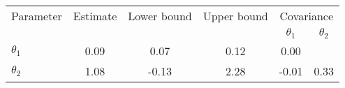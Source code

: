 \begin{tabular}{l|ccc|cc} \hline \hline 
Parameter & Estimate & Lower bound & Upper bound & \multicolumn{2}{c}{Covariance}  \\& & & & $\theta_1$ & $\theta_2$ \\ \hline 
$\theta_1$ & 0.09 & 0.07 & 0.12 & 0.00 & \\ 
$\theta_2$ & 1.08 & -0.13 & 2.28 & -0.01 & 0.33 \\ 
\hline \hline 
\end{tabular} 
